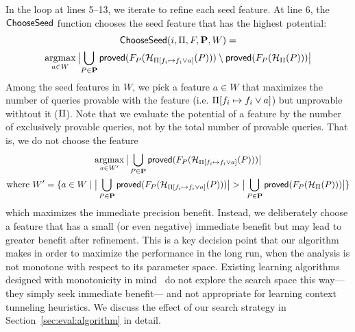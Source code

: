 


In the loop at lines 5--13, we iterate to refine each seed feature.
At line 6, the ${\sf ChooseSeed}$ function chooses the seed feature that
has the highest potential:
\begin{multline*}
  \ChooseSeed(i,\params, F, \vec{P}, W) = \\ \argmax_{a\in W}\big\lvert
  {\bigcup_{P\in \vec{P}}{ \precision(F_P(\heuristic_{\params{[f_i
          \mapsto f_i \vee a]}}(P)))} \setminus
    \precision(F_P(\heuristic_{\params}(P))) }\big\rvert
\end{multline*}
Among the seed features in $W$, we pick a feature $a \in W$ that
maximizes the number of queries provable with the feature
(i.e. $\Pi[f_i \mapsto f_i \vee a]$) but unprovable withtout it
($\Pi$).  Note that we evaluate the potential of a feature by the
number of exclusively provable queries, not by the total number of
provable queries.  That is, we do not choose the feature
\begin{multline}\label{eq:greedy-choose-seed}
\argmax_{a\in W'}\big\lvert \bigcup_{P\in \vec{P}}{
    \precision(F_P(\heuristic_{\params{[f_i \mapsto f_i \vee
        a]}}(P)))} \big\rvert\\\text{where}~W'=\myset{a\in W \mid \big\lvert \bigcup_{P\in \vec{P}}{\precision(F_P(\heuristic_{\params{[f_i \mapsto f_i \vee a]}}(P)))} \big\rvert > \big\lvert \bigcup_{P\in \vec{P}}{\precision(F_P(\heuristic_{\params}(P)))} \big\rvert}
\end{multline}
which maximizes the immediate precision benefit. Instead, we
deliberately choose a feature that has a small (or even negative)
immediate benefit but may lead to greater benefit after refinement.
This is a key decision point that our algorithm makes in order to
maximize the performance in the long run, when the
analysis is not monotone with respect to its
parameter space. Existing learning
algorithms designed with monotonicity in mind~\cite{JeJeChOh17,Liang2011learning} do
not explore the search space this way---they simply seek
immediate benefit--- and not appropriate for learning
context tunneling heuristics. We discuss the effect of
our search strategy in Section~\ref{sec:eval:algorithm} in detail.


